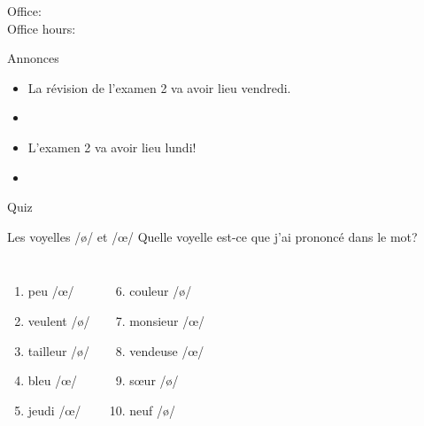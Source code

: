 \documentclass{beamer}
\subtitle[Vêtements, \lexi{mettre} et adjectifs démonstratifs]{Les vêtements, le verbe \lexi{mettre} et les adjectifs démonstratifs}
\begin{document}
  \begin{frame}
    \titlepage
    \tiny{Office: \\
          Office hours: }
  \end{frame}

  \begin{frame}{Annonces}
    \begin{itemize}
      \item La révision de l'examen 2 va avoir lieu vendredi.
      \item[] 
      \item L'examen 2 va avoir lieu lundi!
      \item[] 
    \end{itemize}
  \end{frame}

  \begin{frame}{}
    \begin{center}
      \Large Quiz
    \end{center}
  \end{frame}

  \begin{frame}{Les voyelles /ø/ et /œ/}
    Quelle voyelle est-ce que j'ai prononcé dans le mot? \\
    \begin{columns}
        \begin{enumerate}
          \item peu  /œ/
          \item veulent /ø/ 
          \item tailleur /ø/ 
          \item bleu  /œ/
          \item jeudi  /œ/
        \end{enumerate}
        \begin{enumerate}
          \setcounter{enumi}{5}
          \item couleur /ø/ 
          \item monsieur  /œ/
          \item vendeuse  /œ/
          \item sœur /ø/ 
          \item neuf /ø/ 
        \end{enumerate}
    \end{columns}
  \end{frame}
\end{document}
